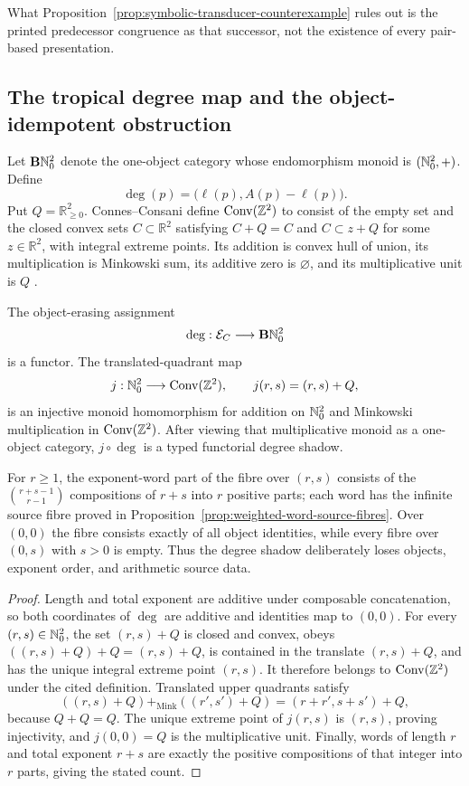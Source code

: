 What Proposition~\ref{prop:symbolic-transducer-counterexample} rules out is
the printed predecessor congruence as that successor, not the existence of
every pair-based presentation.

\subsection{The tropical degree map and the object-idempotent obstruction}

Let $\mathbf B\mathbb{N}_{0}^2$ denote the one-object category whose endomorphism
monoid is $(\mathbb{N}_{0}^2,+)$.  Define
\[
 \deg(p)=\bigl(\ell(p),A(p)-\ell(p)\bigr).
\]
Put $Q=\mathbb R_{\geq0}^2$.  Connes--Consani define
$\operatorname{Conv}(\mathbb{Z}^2)$ to consist of the empty set and the closed
convex sets $C\subset\mathbb R^2$ satisfying $C+Q=C$ and
$C\subset z+Q$ for some $z\in\mathbb R^2$, with integral extreme points.  Its addition is
convex hull of union, its multiplication is Minkowski sum, its additive
zero is $\varnothing$, and its multiplicative unit is $Q$
\cite{ConnesConsani2016}.

\begin{proposition}
\label{prop:symbolic-tropical-degree-shadow}
The object-erasing assignment
\[
 \deg:\mathcal E_C\longrightarrow\mathbf B\mathbb{N}_{0}^2
\]
is a functor.  The translated-quadrant map
\[
 j:\mathbb{N}_{0}^2\longrightarrow\operatorname{Conv}(\mathbb{Z}^2),
 \qquad j(r,s)=(r,s)+Q,
\]
is an injective monoid homomorphism for addition on $\mathbb{N}_{0}^2$ and
Minkowski multiplication in $\operatorname{Conv}(\mathbb{Z}^2)$.  After viewing that
multiplicative monoid as a one-object category, $j\circ\deg$ is a typed
functorial degree shadow.

For $r\geq1$, the exponent-word part of the fibre over $(r,s)$ consists of
the $\binom{r+s-1}{r-1}$ compositions of $r+s$ into $r$ positive parts;
each word has the infinite source fibre proved in
Proposition~\ref{prop:weighted-word-source-fibres}.  Over $(0,0)$ the fibre
consists exactly of all object identities, while every fibre over $(0,s)$
with $s>0$ is empty.  Thus the degree shadow deliberately loses objects,
exponent order, and arithmetic source data.
\end{proposition}

\begin{proof}
Length and total exponent are additive under composable concatenation, so
both coordinates of $\deg$ are additive and identities map to $(0,0)$.
For every $(r,s)\in\mathbb{N}_{0}^2$, the set $(r,s)+Q$ is closed and convex, obeys
$((r,s)+Q)+Q=(r,s)+Q$, is contained in the translate $(r,s)+Q$, and has the
unique integral extreme point $(r,s)$.  It therefore belongs to
$\operatorname{Conv}(\mathbb{Z}^2)$ under the cited definition.
Translated upper quadrants satisfy
\[
 ((r,s)+Q)+_{\mathrm{Mink}}((r',s')+Q)
 =(r+r',s+s')+Q,
\]
because $Q+Q=Q$.  The unique extreme point of $j(r,s)$ is $(r,s)$, proving
injectivity, and $j(0,0)=Q$ is the multiplicative unit.  Finally,
words of length $r$ and total exponent $r+s$ are exactly the positive
compositions of that integer into $r$ parts, giving the stated count.
\end{proof}

